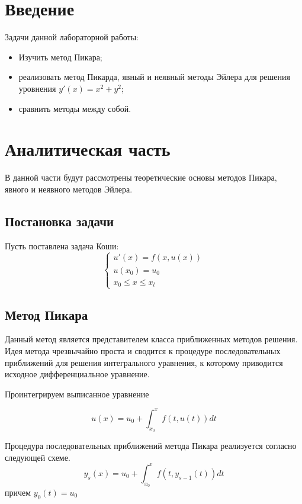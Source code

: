 \documentclass[12pt]{report}
\begin{document}
\tableofcontents
\setcounter{page}{2}

\newpage
\chapter*{Введение}

Задачи данной лабораторной работы:
\begin{itemize}
	\item Изучить метод Пикара;
	\item реализовать метод Пикарда, явный и неявный методы Эйлера для решения уровнения $y'(x) = x^2 + y^2$;
	\item сравнить методы между собой.
\end{itemize}
\chapter{Аналитическая часть}
В данной части будут рассмотрены теоретические основы методов Пикара, явного и неявного методов Эйлера. 

\section{Постановка задачи} 
Пусть поставлена задача Коши:
\begin{equation*}
	\begin{cases}
	u'(x) = f(x, u(x))\\
	u(x_0) = u_0 \\
	x_0 \leq x \leq x_l
	\end{cases}
\end{equation*}
\section{Метод Пикара}
Данный метод является представителем класса приближенных методов решения.
Идея метода чрезвычайно проста и сводится к процедуре последовательных приближений для решения интегрального уравнения, к которому приводится исходное дифференциальное уравнение.

Проинтегрируем выписанное уравнение

\begin{equation}
	u(x) = u_0 + \int_{x_0}^{x} f(t,u(t))dt
\end{equation}

Процедура последовательных приближений метода Пикара реализуется согласно следующей схеме.
\begin{equation}
y_s(x) = u_0 + \int_{x_0}^{x} f(t,y_{s-1}(t))dt
\end{equation}
причем $y_0(t) = u_0$
\end{document}
